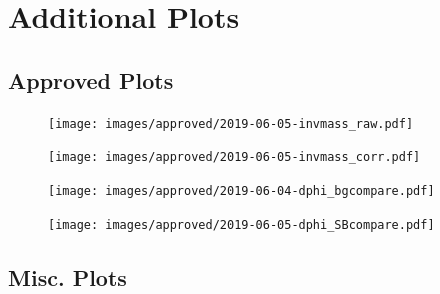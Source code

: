 \documentclass[ALICE,manyauthors]{ALICE_analysis_notes}
\begin{document}
\clearpage
\section {Additional Plots}

\subsection{Approved Plots}

\begin{figure}[!htb]
\centering
\texttt{[image: images/approved/2019-06-05-invmass\_raw.pdf]}
\caption{}
\label{}
\end{figure}

\begin{figure}[!htb]
\centering
\texttt{[image: images/approved/2019-06-05-invmass\_corr.pdf]}
\caption{}
\label{}
\end{figure}

\begin{figure}[!htb]
\centering
\texttt{[image: images/approved/2019-06-04-dphi\_bgcompare.pdf]}
\caption{}
\label{}
\end{figure}

\begin{figure}[!htb]
\centering
\texttt{[image: images/approved/2019-06-05-dphi\_SBcompare.pdf]}
\caption{}
\label{}
\end{figure}

\begin{figure}[!htb]
\centering
\begin{subfigure}{
\texttt{[image: images/approved/2019-06-05-dphi\_hhall.pdf]}}
\end{subfigure}
\begin{subfigure}{
\texttt{[image: images/approved/2019-06-05-dphi\_hphiall.pdf]}
}
\end{subfigure}
\caption{}
\label{}
\end{figure}

\clearpage
\subsection{Misc. Plots}

\begin{figure}[!htb]
\centering
\begin{subfigure}{
\texttt{[image: images/addendum/hh\_50\_80\_fullbg.pdf]}
}
\end{subfigure}
\begin{subfigure}{
\texttt{[image: images/addendum/hphi\_50\_80\_fullbg.pdf]}
}
\end{subfigure}
\caption{}
\label{}
\end{figure}
\end{document}
